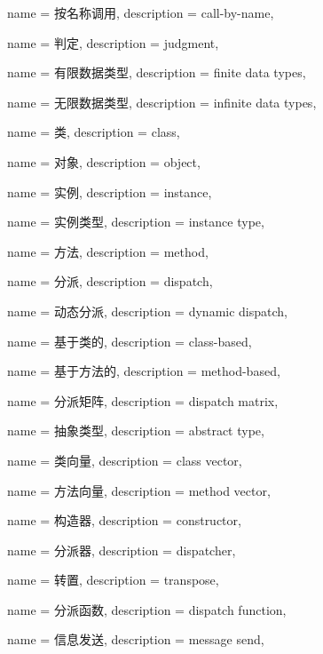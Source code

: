 {
	name = 按名称调用,
	description = {call-by-name},
}

{
	name = 判定,
	description = {judgment},
}

{
	name = 有限数据类型,
	description = {finite data types},
}


{
	name = 无限数据类型,
	description = {infinite data types},
}

{
    name = 类,
    description = {class},
}

{
    name = 对象,
    description = {object},
}

{
    name = 实例,
    description = {instance},
}

{
    name = 实例类型,
    description = {instance type},
}

{
    name = 方法,
    description = {method},
}

{
    name = 分派,
    description = {dispatch},
}

{
    name = 动态分派,
    description = {dynamic dispatch},
}

{
    name = 基于类的,
    description = {class-based},
}

{
    name = 基于方法的,
    description = {method-based},
}

{
    name = 分派矩阵,
    description = {dispatch matrix},
}

{
    name = 抽象类型,
    description = {abstract type},
}

{
    name = 类向量,
    description = {class vector},
}

{
    name = 方法向量,
    description = {method vector},
}

{
    name = 构造器,
    description = {constructor},
}

{
    name = 分派器,
    description = {dispatcher},
}

{
    name = 转置,
    description = {transpose},
}

{
    name = 分派函数,
    description = {dispatch function},
}

{
    name = 信息发送,
    description = {message send},
}






